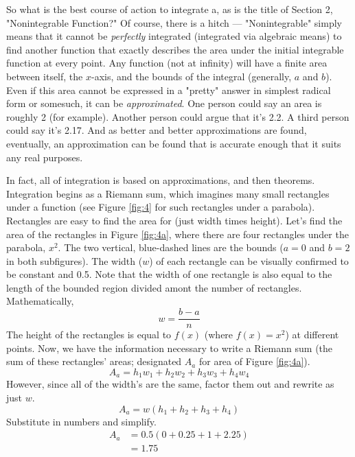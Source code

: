 \documentclass{article}
\newcounter{example}%
\begin{document}
So what is the best course of action to integrate a, as is the title of Section 2, "Nonintegrable Function?" Of course, there is a hitch --- "Nonintegrable" simply means that it cannot be \emph{perfectly} integrated (integrated via algebraic means) to find another function that exactly describes the area under the initial integrable function at every point. Any function (not at infinity) will have a finite area between itself, the $x$-axis, and the bounds of the integral (generally, $a$ and $b$). Even if this area cannot be expressed in a "pretty" answer in simplest radical form or somesuch, it can be \emph{approximated}. One person could say an area is roughly 2 (for example). Another person could argue that it's 2.2. A third person could say it's 2.17. And as better and better approximations are found, eventually, an approximation can be found that is accurate enough that it suits any real purposes.\par
In fact, all of integration is based on approximations, and then theorems. Integration begins as a Riemann sum, which imagines many small rectangles under a function (see Figure \ref{fig:4} for such rectangles under a parabola). Rectangles are easy to find the area for (just width times height). Let's find the area of the rectangles in Figure \ref{fig:4a}, where there are four rectangles under the parabola, $x^2$. The two vertical, blue-dashed lines are the bounds ($a=0$ and $b=2$ in both subfigures). The width ($w$) of each rectangle can be visually confirmed to be constant and 0.5. Note that the width of one rectangle is also equal to the length of the bounded region divided amont the number of rectangles. Mathematically,
\begin{equation}
    w=\frac{b-a}{n}
\end{equation}
The height of the rectangles is equal to $f(x)$ (where $f(x)=x^2$) at different points. Now, we have the information necessary to write a Riemann sum (the sum of these rectangles' areas; designated $A_a$ for area of Figure \ref{fig:4a}).
\begin{equation*}
    A_a = h_1w_1+h_2w_2+h_3w_3+h_4w_4
\end{equation*}
However, since all of the width's are the same, factor them out and rewrite as just $w$.
\begin{equation*}
    A_a = w(h_1+h_2+h_3+h_4)
\end{equation*}
Substitute in numbers and simplify.
\begin{align*}
    A_a &= 0.5(0+0.25+1+2.25)\\
    &= 1.75
\end{align*}
\end{document}
